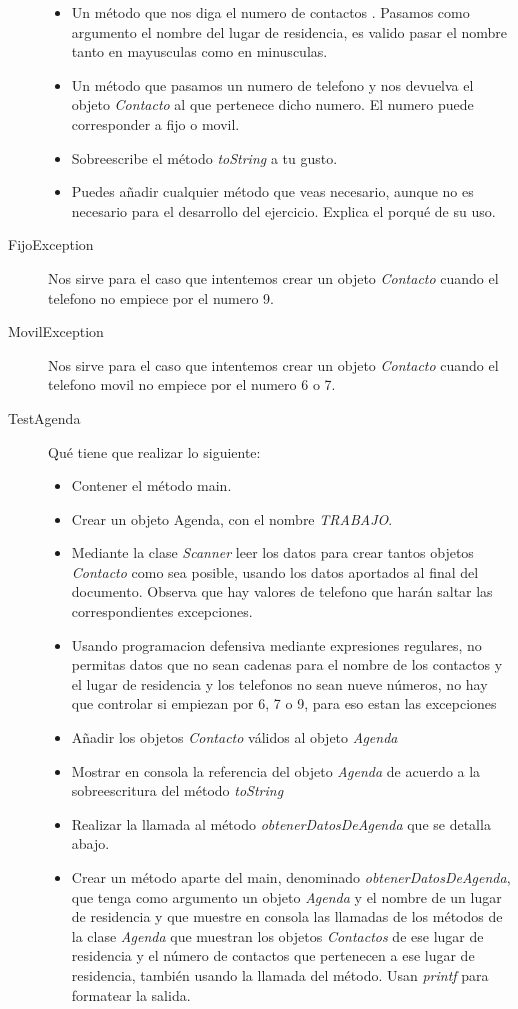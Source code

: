 \documentclass[addpoints,12pt]{exam}
\begin{document}
\begin{questions}
\begin{description}
\begin{itemize}
\item Un método que nos diga el numero de contactos . Pasamos como argumento el nombre del lugar de residencia, es valido pasar el nombre tanto en mayusculas como en minusculas.
\item Un método que pasamos un numero de telefono y nos devuelva el objeto \emph{Contacto} al que pertenece dicho numero. El numero puede corresponder a fijo o movil.
\item Sobreescribe el método \emph{toString} a tu gusto.
\item Puedes añadir cualquier método que veas necesario, aunque no es necesario para el desarrollo del ejercicio. Explica el porqué de su uso.
\end{itemize}
\item[FijoException] Nos sirve para el caso que intentemos crear un objeto \emph{Contacto} cuando el telefono no empiece por el numero 9.
\item[MovilException] Nos sirve para el caso que intentemos crear un objeto \emph{Contacto} cuando el telefono movil no empiece por el numero 6 o 7.
\item[TestAgenda] Qué tiene que realizar lo siguiente:
\begin{itemize}
\item Contener el método main.
\item Crear un objeto Agenda, con el nombre \emph{TRABAJO}.
\item Mediante la clase \emph{Scanner} leer los datos para crear tantos objetos \emph{Contacto} como sea posible, usando los datos aportados al final del documento. Observa que hay valores de telefono que harán saltar las correspondientes excepciones.
\item Usando programacion defensiva mediante expresiones regulares, no permitas datos que no sean cadenas para el nombre de los contactos y el lugar de residencia y los telefonos no sean nueve números, no hay que controlar si empiezan por 6, 7 o 9, para eso estan las excepciones
\item Añadir los objetos \emph{Contacto} válidos al objeto \emph{Agenda}
\item Mostrar en consola la referencia del objeto \emph{Agenda} de acuerdo a la sobreescritura del método \emph{toString}
\item Realizar la llamada al método \emph{obtenerDatosDeAgenda} que se detalla abajo.
\item Crear un método aparte del main, denominado \emph{obtenerDatosDeAgenda}, que tenga como argumento un objeto \emph{Agenda} y el  nombre de un lugar de residencia y que muestre en consola las llamadas de los métodos de la clase \emph{Agenda} que  muestran los objetos \emph{Contactos} de ese lugar de residencia y el número de contactos que pertenecen a ese lugar de residencia, también usando la llamada del método. Usan \emph{printf} para formatear la salida.

\end{itemize}
\end{description}
\end{questions}
\end{document}
